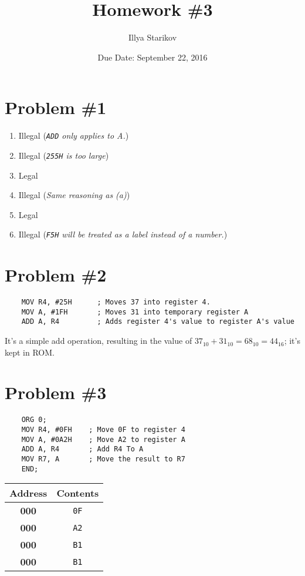 \documentclass[12pt]{article}
\title{Homework \#3}
\date{Due Date: September 22, 2016}
\author{Illya Starikov}
\newcounter{map}
\newcommand{\address}{
    \textbf{000\themap}
    \addtocounter{map}{1}
}
\newcommand{\contents}[1]{
    \texttt{#1}
}
\begin{document}
\maketitle

\section*{Problem \#1}
\begin{enumerate}[label=(\alph*)]
    \item Illegal (\textit{\texttt{ADD} only applies to A.})
    \item Illegal (\textit{\texttt{255H} is too large})
    \item Legal
    \item Illegal (\textit{Same reasoning as (a)})
    \item Legal
    \item Illegal (\textit{\texttt{F5H} will be treated as a label instead of a number.})
\end{enumerate}

\section*{Problem \#2}
\begin{verbatim}
    MOV R4, #25H      ; Moves 37 into register 4.
    MOV A, #1FH       ; Moves 31 into temporary register A
    ADD A, R4         ; Adds register 4's value to register A's value
\end{verbatim}

It's a simple add operation, resulting in the value of $37_{10} + 31_{10} = 68_{10} = 44_{16}$; it's kept in ROM.

\section*{Problem \#3}
\begin{multicols}{2}
\begin{verbatim}
    ORG 0;
    MOV R4, #0FH    ; Move 0F to register 4
    MOV A, #0A2H    ; Move A2 to register A
    ADD A, R4       ; Add R4 To A
    MOV R7, A       ; Move the result to R7
    END;
\end{verbatim}

\begin{center}
    \begin{tabular}{|c|c|}
        \hline
        \textbf{Address} & \textbf{Contents} \\ \hline
        \address & \contents{0F} \\ \hline
        \address & \contents{A2} \\ \hline
        \address & \contents{B1} \\ \hline
        \address & \contents{B1} \\ \hline
    \end{tabular}
\end{center}

\end{multicols}
\end{document}
